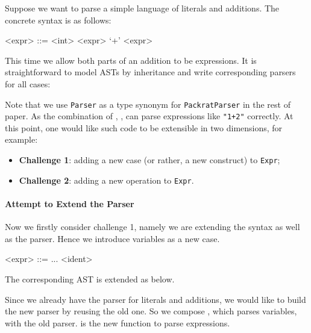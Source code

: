 Suppose we want to parse a simple language of literals and
additions. The concrete syntax is as follows:

\setlength{\grammarindent}{5em}
\begin{grammar}
<expr> ::= <int>
    \alt <expr> `+' <expr>
\end{grammar}

This time we allow both parts of an addition to be expressions.
It is straightforward to model ASTs by inheritance and write corresponding parsers for all cases:


\noindent Note that we use \lstinline{Parser} as a type synonym for \lstinline{PackratParser} in the rest of paper. As the combination of , ,  can parse expressions like \lstinline{"1+2"} correctly. At this point, one would like such code to be extensible in two dimensions, for example:
\begin{itemize}
\item \textbf{Challenge 1}: adding a new case (or rather, a new construct) to \lstinline{Expr};
\item \textbf{Challenge 2}: adding a new operation to \lstinline{Expr}.
\end{itemize}

\paragraph{Attempt to Extend the Parser} Now we firstly consider challenge 1, namely we are extending the syntax as well as the parser. Hence we introduce variables as a new case.

\setlength{\grammarindent}{5em}
\begin{grammar}
<expr> ::= ...
   \alt <ident>
\end{grammar}

The corresponding AST is extended as below.


Since we already have the parser for literals and additions, we would like to build the new parser by reusing the old one. So we compose , which parses variables, with the old parser.  is the new function to parse expressions.

